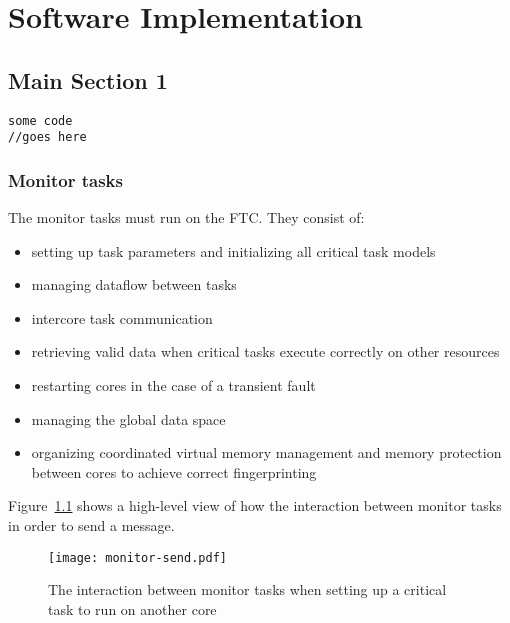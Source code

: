 
\chapter{Software Implementation} %

\label{c:soft-impl} %


\section{Main Section 1}
 
\begin{lstlisting}
some code
//goes here
\end{lstlisting}


\subsection{Monitor tasks}
The monitor tasks must run on the FTC. They consist of:
\begin{itemize}
  \item setting up task parameters and initializing all critical task models
  \item managing dataflow between tasks 
  \item intercore task communication 
  \item retrieving valid data when critical tasks execute correctly on other resources 
  \item restarting cores in the case of a transient fault
  \item managing the global data space
  \item organizing coordinated virtual memory management and memory protection between cores to achieve correct fingerprinting
\end{itemize} 

Figure~\ref{f:monitor-send} shows a high-level view of how the interaction between monitor tasks in order to send a message.

\begin{figure}
\centering
\texttt{[image: monitor-send.pdf]}
\caption{The interaction between monitor tasks when setting up a critical task to run on another core}
\label{f:monitor-send}
\end{figure}
